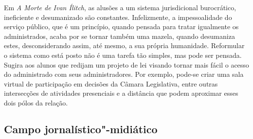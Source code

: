 \documentclass[12pt]{extarticle}
\begin{document}
Em \emph{A Morte de Ivan Ílitch}, as alusões a um sistema
jurisdicional burocrático, ineficiente e desumanizado são
constantes. Infelizmente, a impessoalidade do serviço público, que é
um princípio, quando pensada para tratar igualmente os
administrados, acaba por se tornar também uma mazela, quando
desumaniza estes, desconsiderando assim, até mesmo, a sua própria
humanidade. Reformular o sistema como está posto não é uma tarefa tão simples, mas pode ser pensada. Sugira aos alunos que redijam um projeto de
lei visando tornar mais fácil o acesso do administrado com seus
administradores. Por exemplo, pode-se criar uma sala virtual de
participação em decisões da Câmara Legislativa, entre outras
intersecções de atividades presenciais e a distância que podem
aproximar esses dois pólos da relação.

\subsection{Campo jornalístico"-midiático}

\begin{comment}
\begin{quote}
Em relação ao campo jornalístico"-midiático, espera"-se que os jovens
que chegam ao Ensino Médio sejam capazes de: compreender os fatos e
circunstâncias principais relatados; perceber a impossibilidade de
neutralidade absoluta no relato de fatos; adotar procedimentos básicos
de checagem de veracidade de informação; identificar diferentes pontos
de vista diante de questões polêmicas de relevância social; avaliar
argumentos utilizados e posicionar"-se em relação a eles de forma ética;
identificar e denunciar discursos de ódio e que envolvam desrespeito aos
Direitos Humanos; e produzir textos jornalísticos variados, tendo em
vista seus contextos de produção e características dos gêneros. Eles
também devem ter condições de analisar estratégias
linguístico"-discursivas utilizadas pelos textos publicitários e de
refletir sobre necessidades e condições de consumo.

No Ensino Médio, os jovens precisam aprofundar a análise dos interesses
que movem o campo jornalístico midiático, da relação entre informação e
opinião, com destaque para o fenômeno da pós"-verdade, consolidar o
desenvolvimento de habilidades, apropriar"-se de mais procedimentos
envolvidos na curadoria de informações, ampliar o contato com projetos
editoriais independentes e tomar consciência de que uma mídia
independente e plural é condição indispensável para a democracia.

Como já destacado, as práticas que têm lugar nas redes sociais têm
tratamento ampliado. (\textsc{bncc}, p. 494-495)
\end{quote}
\end{comment}
\end{document}
